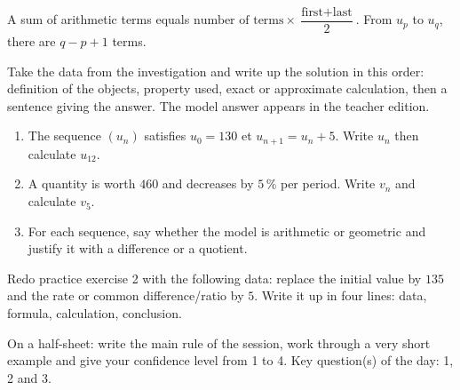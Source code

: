 \begin{traceecrite}A sum of arithmetic terms equals $\text{number of terms}\times\dfrac{\text{first}+\text{last}}2$. From $u_p$ to $u_q$, there are $q-p+1$ terms.\end{traceecrite}

\begin{exemple}
Take the data from the investigation and write up the solution in this order: definition of the objects, property used, exact or approximate calculation, then a sentence giving the answer. The model answer appears in the teacher edition.
\end{exemple}

\begin{exercice}[-- essential]
\begin{enumerate}\item The sequence $(u_n)$ satisfies $u_0=130$ et $u_{n+1}=u_n+5$. Write $u_n$ then calculate $u_{12}$.\item A quantity is worth $460$ and decreases by $5\,\%$ per period. Write $v_n$ and calculate $v_5$.\item For each sequence, say whether the model is arithmetic or geometric and justify it with a difference or a quotient.\end{enumerate}
\end{exercice}


\begin{dm}Redo practice exercise 2 with the following data: replace the initial value by $135$ and the rate or common difference/ratio by $5$. Write it up in four lines: data, formula, calculation, conclusion.\end{dm}

\begin{sortie}On a half-sheet: write the main rule of the session, work through a very short example and give your confidence level from 1 to 4. Key question(s) of the day: 1, 2 and 3.\end{sortie}

